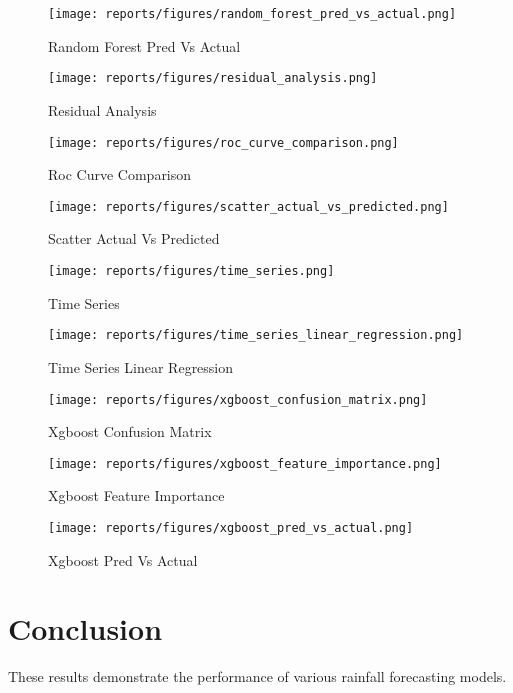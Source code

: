 \documentclass{article}
\begin{document}
\begin{figure}[h!]
    \centering
    \texttt{[image: reports/figures/random\_forest\_pred\_vs\_actual.png]}
    \caption{Random Forest Pred Vs Actual}
    \label{fig:random_forest_pred_vs_actual}
\end{figure}

\begin{figure}[h!]
    \centering
    \texttt{[image: reports/figures/residual\_analysis.png]}
    \caption{Residual Analysis}
    \label{fig:residual_analysis}
\end{figure}

\begin{figure}[h!]
    \centering
    \texttt{[image: reports/figures/roc\_curve\_comparison.png]}
    \caption{Roc Curve Comparison}
    \label{fig:roc_curve_comparison}
\end{figure}

\begin{figure}[h!]
    \centering
    \texttt{[image: reports/figures/scatter\_actual\_vs\_predicted.png]}
    \caption{Scatter Actual Vs Predicted}
    \label{fig:scatter_actual_vs_predicted}
\end{figure}

\begin{figure}[h!]
    \centering
    \texttt{[image: reports/figures/time\_series.png]}
    \caption{Time Series}
    \label{fig:time_series}
\end{figure}

\begin{figure}[h!]
    \centering
    \texttt{[image: reports/figures/time\_series\_linear\_regression.png]}
    \caption{Time Series Linear Regression}
    \label{fig:time_series_linear_regression}
\end{figure}

\begin{figure}[h!]
    \centering
    \texttt{[image: reports/figures/xgboost\_confusion\_matrix.png]}
    \caption{Xgboost Confusion Matrix}
    \label{fig:xgboost_confusion_matrix}
\end{figure}

\begin{figure}[h!]
    \centering
    \texttt{[image: reports/figures/xgboost\_feature\_importance.png]}
    \caption{Xgboost Feature Importance}
    \label{fig:xgboost_feature_importance}
\end{figure}

\begin{figure}[h!]
    \centering
    \texttt{[image: reports/figures/xgboost\_pred\_vs\_actual.png]}
    \caption{Xgboost Pred Vs Actual}
    \label{fig:xgboost_pred_vs_actual}
\end{figure}

\section{Conclusion}
These results demonstrate the performance of various rainfall forecasting models.
\end{document}
